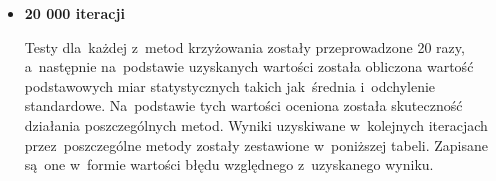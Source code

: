 \begin{itemize}
\item  \textbf{20 000 iteracji}

Testy dla~każdej z~metod krzyżowania zostały przeprowadzone 20 razy, a~następnie na~podstawie uzyskanych wartości została obliczona wartość podstawowych miar statystycznych takich jak~średnia i~odchylenie standardowe. Na~podstawie tych wartości oceniona została skuteczność działania poszczególnych metod. Wyniki uzyskiwane w~kolejnych iteracjach przez~poszczególne metody zostały zestawione w~poniższej tabeli. Zapisane są~one w~formie wartości błędu względnego z~uzyskanego wyniku.\\
\par
\begin{table}[h!]
\begin{center}
\caption{Wartości błędu względnego funkcji celu dla poszczególnych metod krzyżowania, reprodukcja losowa,  mutacja DE/rand/1, 20 000 iteracji.}
\end{center}
\end{table}
\end{itemize}

